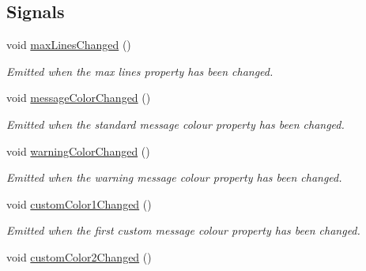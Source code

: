 \subsection*{Signals}
\begin{DoxyCompactItemize}
\item 
\hypertarget{class_console_widget_ad8c0d1aba62d12986b8ec8faeff1a2ae}{void \hyperlink{class_console_widget_ad8c0d1aba62d12986b8ec8faeff1a2ae}{max\-Lines\-Changed} ()}\label{class_console_widget_ad8c0d1aba62d12986b8ec8faeff1a2ae}

\begin{DoxyCompactList}\small\item\em Emitted when the max lines property has been changed. \end{DoxyCompactList}\item 
\hypertarget{class_console_widget_a51d0bb1f81c3c8dff9788f5dbf03b569}{void \hyperlink{class_console_widget_a51d0bb1f81c3c8dff9788f5dbf03b569}{message\-Color\-Changed} ()}\label{class_console_widget_a51d0bb1f81c3c8dff9788f5dbf03b569}

\begin{DoxyCompactList}\small\item\em Emitted when the standard message colour property has been changed. \end{DoxyCompactList}\item 
\hypertarget{class_console_widget_a10b823a6b68216c362f75ed01d5fae81}{void \hyperlink{class_console_widget_a10b823a6b68216c362f75ed01d5fae81}{warning\-Color\-Changed} ()}\label{class_console_widget_a10b823a6b68216c362f75ed01d5fae81}

\begin{DoxyCompactList}\small\item\em Emitted when the warning message colour property has been changed. \end{DoxyCompactList}\item 
\hypertarget{class_console_widget_aa28f784431c1fcb257ca607abf482741}{void \hyperlink{class_console_widget_aa28f784431c1fcb257ca607abf482741}{custom\-Color1\-Changed} ()}\label{class_console_widget_aa28f784431c1fcb257ca607abf482741}

\begin{DoxyCompactList}\small\item\em Emitted when the first custom message colour property has been changed. \end{DoxyCompactList}\item 
\hypertarget{class_console_widget_abe4b076d1edab52e276659a6ae55bdc5}{void \hyperlink{class_console_widget_abe4b076d1edab52e276659a6ae55bdc5}{custom\-Color2\-Changed} ()}\label{class_console_widget_abe4b076d1edab52e276659a6ae55bdc5}


\end{DoxyCompactItemize}
